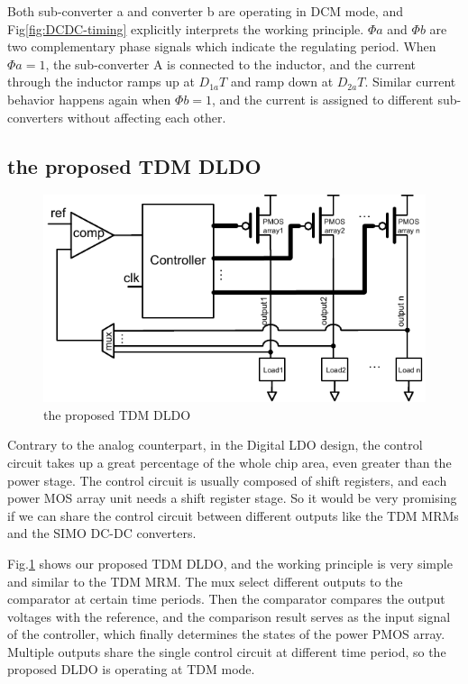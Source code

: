 \documentclass[journal]{IEEEtran}
\begin{document}
Both sub-converter a and converter b are operating in DCM mode, and Fig\ref{fig:DCDC-timing} explicitly interprets the working principle. $\Phi a$ and $\Phi b$ are two complementary phase signals which indicate the regulating period. When $\Phi a = 1$, the sub-converter A is connected to the inductor, and the current through the inductor ramps up at $D_{1a}T$ and ramp down at $D_{2a}T$. Similar current behavior happens again when $\Phi b =1$, and the current is assigned to different sub-converters without affecting each other. 

\subsection{the proposed TDM DLDO}
\begin{figure}[t!]
    \centering
    \includegraphics[width=\linewidth]{pic/TDM/TDMDLDO.pdf}
    \caption{the proposed TDM DLDO}
    \label{fig:TDMDLDO}
\end{figure}
Contrary to the analog counterpart, in the Digital LDO design, the control circuit takes up a great percentage of the whole chip area, even greater than the power stage. The control circuit is usually composed of shift registers, and each power MOS array unit needs a shift register stage. So it would be very promising if we can share the control circuit between different outputs like the TDM MRMs and the SIMO DC-DC converters.

Fig.\ref{fig:TDMDLDO} shows our proposed TDM DLDO, and the working principle is very simple and similar to the TDM MRM. The mux select different outputs to the comparator at certain time periods. Then the comparator compares the output voltages with the reference, and the comparison result serves as the input signal of the controller, which finally determines the states of the power PMOS array. Multiple outputs share the single control circuit at different time period, so the proposed DLDO is operating at TDM mode.
\end{document}
